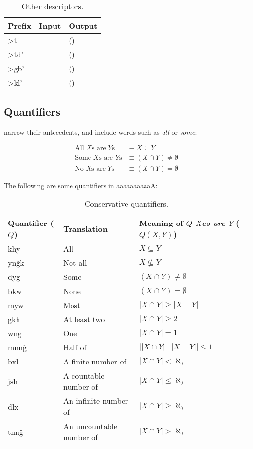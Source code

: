\documentclass{book}
\newcommand{\lname}{aaaaaaaaaaA}
\begin{document}
\begin{table}[h]
  \caption{Other descriptors.}
  \centering
  \begin{tabu}to 
    \textnormal{Prefix} & Input & Output \\
    \hline
    >t' &  &
    () \\
    >td' &  &
    () \\
    >gb' &  &
    () \\
    >kl' &  &
    () \\
  \end{tabu}
\end{table}

\subsection{Quantifiers}

 narrow their antecedents, and include words such as \emph{all} or \emph{some}:

\begin{align}
  \text{All $X$s are $Y$s} &\equiv X \subseteq Y \\
  \text{Some $X$s are $Y$s} &\equiv (X \cap Y) \neq \emptyset \\
  \text{No $X$s are $Y$s} &\equiv (X \cap Y) = \emptyset
\end{align}

The following are some quantifiers in \lname:

\begin{table}[h]
  \caption{Conservative quantifiers.}
  \centering
  \begin{tabu}to 
    \textnormal{Quantifier ($Q$)} & Translation & Meaning of \emph{$Q$ $X$es are $Y$} ($Q(X, Y)$) \\
    \hline
    khy & All & $X \subseteq Y$ \\
    yn\^gk & Not all & $X \not\subseteq Y$ \\
    dyg & Some & $(X \cap Y) \neq \emptyset$ \\
    bkw & None & $(X \cap Y) = \emptyset$ \\
    myw & Most & $|X \cap Y| \ge |X - Y|$ \\
    gkh & At least two & $|X \cap Y| \ge 2$ \\
    wng & One & $|X \cap Y| = 1$ \\
    mnn\^g & Half of & $| |X \cap Y| - |X - Y| | \le 1$ \\
    bxl & A finite number of & $|X \cap Y| < \aleph_0$ \\
    jsh & A countable number of & $|X \cap Y| \le \aleph_0$ \\
    dlx & An infinite number of & $|X \cap Y| \ge \aleph_0$ \\
    tnn\^g & An uncountable number of & $|X \cap Y| > \aleph_0$ \\
  \end{tabu}
\end{table}
\end{document}
